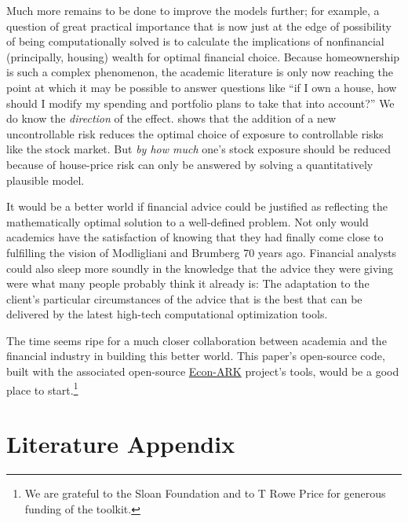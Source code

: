 \documentclass{article}
\begin{document}
Much more remains to be done to improve the models further; for example, a question of great practical importance that is now just at the edge of possibility of being computationally solved is to calculate the implications of nonfinancial (principally, housing) wealth for optimal financial choice.
Because homeownership is such a complex phenomenon, the academic literature is only now reaching the point at which it may be possible to answer questions like ``if I own a house, how should I modify my spending and portfolio plans to take that into account?''
We do know the \textit{direction} of the effect.
\cite{kimballStandardRA} shows that the addition of a new uncontrollable risk reduces the optimal choice of exposure to controllable risks like the stock market.
But \textit{by how much} one's stock exposure should be reduced because of house-price risk can only be answered by solving a quantitatively plausible model.

It would be a better world if financial advice could be justified as reflecting the mathematically optimal solution to a well-defined problem.
Not only would academics have the satisfaction of knowing that they had finally come close to fulfilling the vision of Modligliani and Brumberg 70 years ago.
Financial analysts could also sleep more soundly in the knowledge that the advice they were giving were what many people probably think it already is: The adaptation to the client's particular circumstances of the advice that is the best that can be delivered by the latest high-tech computational optimization tools.

The time seems ripe for a much closer collaboration between academia and the financial industry in building this better world.  This paper's open-source code, built with the associated open-source \href{https://econ-ark.org}{Econ-ARK} project's tools, would be a good place to start.\footnote{We are grateful to the Sloan Foundation and to T Rowe Price for generous funding of the toolkit.}

\section{Literature Appendix}\label{lit-review}
\end{document}
